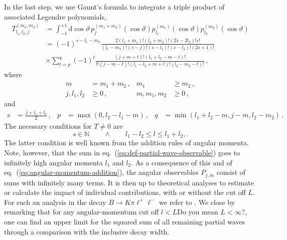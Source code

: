\documentclass[aps,prd,reprint,nofootinbib,preprintnumbers]{revtex4}
\newcommand{\refeq}[1]{eq.~(\ref{eq:#1})}
\newcommand{\rmdx}[1]{\mbox{d} #1 \,} %
\renewcommand{\theta}{\vartheta}
\newcommand{\fred}[1]{{\color{brown!85!black}#1}}
\begin{document}
In the last step, we use Gaunt's formula \cite{Gaunt:1929} to integrate a triple product of associated Legendre polynomials,
\begin{equation}
\begin{aligned}
    T_{l_1,l_2,j}^{(m_1,m_2)}
        & = \int_{-1}^{+1} \rmdx{\cos\theta} p_{j}^{(m_1 + m_2)}(\cos\theta) p_{l_1}^{(m_1)}(\cos\theta) p_{l_2}^{(m_2)}(\cos\theta)\\
        & = (-1)^{s - l_1 - m_2} \frac{2 (l_1 + m_1)! (l_2 + m_2)! (2s - 2 l_2)! s!}{(l_1 - m_1)! (s - j)! (s - l_1)! (s - l_2)! (2s + 1)!}\\
        & \times \sum_{t=p}^q (-1)^t \frac{(j + m + t)!(l_1 + l_2 - m - t)!}{t! (j - m - t)! (l_1 - l_2 + m + t)! (l_2 - m_2 - t)!}\,,
\end{aligned}
\end{equation}
where
\begin{equation}
\begin{aligned}
    m & = m_1 + m_2\,, &
    m_1 & \geq m_2\,,  \\
    j, l_1, l_2 & \geq 0\,, &
    m, m_1, m_2 & \geq 0\,,
\end{aligned}
\end{equation}
and
\begin{equation}
\begin{aligned}
    s & = \frac{j + l_1 + l_2}{2}\,, &
    p & = \max(0, l_2 - l_1 - m)\,, &
    q & = \min(l_1 + l_2 - m, j - m, l_2 - m_2)\,.
\end{aligned}
\end{equation}
The necessary conditions for $T \neq 0$ are
\begin{equation}
    \label{eq:angular-momentum-addition}
    s \in \mathbb{N}\qquad \wedge \qquad l_1 - l_2 \leq l \leq l_1 + l_2,.
\end{equation}
The latter condition is well known from the addition rules of angular momenta. Note, however, that
the sum in \refeq{def-partial-wave-observable} goes to infinitely high angular momenta $l_1$ and $l_2$. As a consequence
of this and of \refeq{angular-momentum-addition}, the angular observables $P_{j,m}$
consist of sums with infinitely many terms. It is then up to theoretical analyses to
estimate or calculate the impact of individual contributions, with or without the cut off $L$.
For such an analysis in the decay $B\to K\pi\ell^+\ell^-$ we refer to \cite{Das:2014sra}.
We close by remarking that for any angular-momentum cut off $l < L$\fred{Do you mean $L < \infty$?}, one can find an upper limit for the squared sum of all remaining partial waves through a comparison with the inclusive decay
width.



\end{document}
